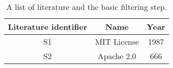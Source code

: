 
\begin{table}[h]
	\begin{center}
		\begin{tabular}{c | c | c} 
			\hline
			Literature identifier & Name & Year\\
			\hline
			S1 & MIT License & 1987 \\
			S2 & Apache 2.0 & 666 \\
		\end{tabular}
		\caption{A list of literature and the basic filtering step.}
		\label{table:appendix:a}
	\end{center}
\end{table}